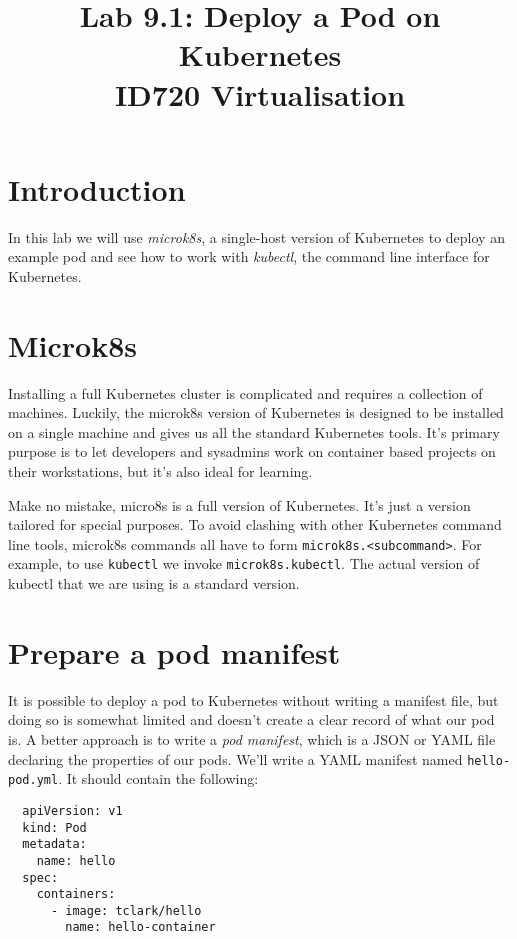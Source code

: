 \documentclass{article}
\begin{document}
\title{Lab 9.1: Deploy a Pod on Kubernetes\\ID720 Virtualisation}
\date{}
\maketitle

\section*{Introduction}
In this lab we will use \emph{microk8s}, a single-host version of Kubernetes to deploy an example pod and see how to work with \emph{kubectl}, the command line interface for Kubernetes. 

\section{Microk8s}
Installing a full Kubernetes cluster is complicated and requires a collection of machines. Luckily, the microk8s version of Kubernetes is designed to be installed on a single machine and gives us all the standard Kubernetes tools. It's primary purpose is to let developers and sysadmins work on container based projects on their workstations, but it's also ideal for learning. 

Make no mistake, micro8s is a full version of Kubernetes. It's just a version tailored for special purposes. To avoid clashing with other Kubernetes command line tools, microk8s commands all have to form \texttt{microk8s.<subcommand>}. For example, to use \texttt{kubectl} we invoke \texttt{microk8s.kubectl}. The actual version of kubectl that we are using is a standard version.


\section{Prepare a pod manifest}
It is possible to deploy a pod to Kubernetes without writing a manifest file, but doing so is somewhat limited and doesn't create a clear record of what our pod is. A better approach is to write a \emph{pod manifest}, which is a JSON or YAML file declaring the properties of our pods. We'll write a YAML manifest named \texttt{hello-pod.yml}. It should contain the following:

\begin{verbatim}
  apiVersion: v1
  kind: Pod
  metadata:
    name: hello
  spec:
    containers:
      - image: tclark/hello
        name: hello-container
\end{verbatim}
\end{document}
